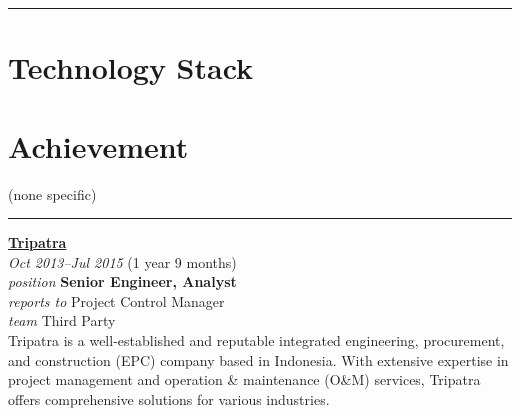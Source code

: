 \documentclass[12pt]{res}
\begin{document}
\begin{resume}
\vspace{-20pt}
\begin{minipage}[t]{0.55\linewidth}
	\rule{0.25\textwidth}{2pt}
	\begin{multicols}{2}
		\section{Technology Stack}
		\columnbreak
		\section{}
	\end{multicols}
	\vspace{1pt}
\end{minipage}
\hfill
\begin{minipage}[t]{0.42\linewidth}
	\vspace{18pt}
	\section{Achievement}
	\begin{flushleft}
        \footnotesize{\vspace{2.6pt}
(none specific)}
	\end{flushleft}
\end{minipage}

\vspace{10pt}
\rule{1.0\textwidth}{0.1pt}

\begin{multicols}{2}
	{\large {\bf \href{https://tripatra.com}{Tripatra}}} \\
	{\footnotesize{\sl Oct 2013--Jul 2015} \hfill (1 year 9 months)}\\
	{\footnotesize{\sl position} \hfill \bf{Senior Engineer, Analyst}}\\
	{\footnotesize{\sl reports to} \hfill Project Control Manager}\\
	{\footnotesize{\sl team} \hfill Third Party}\\

	\columnbreak
	{\footnotesize{Tripatra is a well-established and reputable integrated engineering, procurement, and construction (EPC) company based in Indonesia. With extensive expertise in project management and operation \& maintenance (O\&M) services, Tripatra offers comprehensive solutions for various industries.}}\\
\end{multicols}
\vspace{-20pt}


\end{resume}
\end{document}
